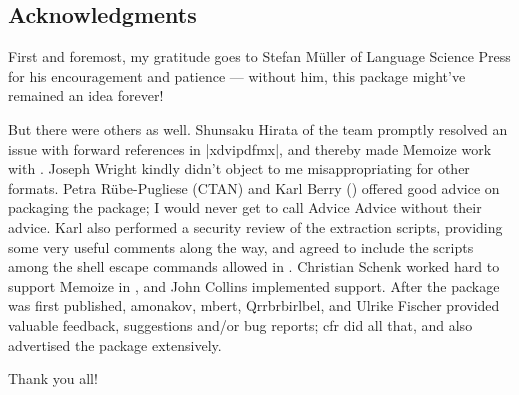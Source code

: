 \documentclass[a4paper,11pt]{article}
\begin{document}
\subsection{Acknowledgments}

First and foremost, my gratitude goes to Stefan Müller of Language Science
Press for his encouragement and patience --- without him, this package might've
remained an idea forever!

But there were others as well.  Shunsaku Hirata of the  team
promptly resolved an issue with forward references in |xdvipdfmx|, and thereby
made Memoize work with .  Joseph Wright kindly didn't object to
me misappropriating  for other formats.  Petra Rübe-Pugliese
(CTAN) and Karl Berry (\TeXLive) offered good advice on packaging the package;
I would never get to call Advice Advice without their advice.  Karl also
performed a security review of the extraction scripts, providing some very
useful comments along the way, and agreed to include the scripts among the
shell escape commands allowed in \TeXLive.  Christian Schenk worked hard to
support Memoize in \MiKTeX, and John Collins implemented  support.
After the package was first published, amonakov, mbert, Qrrbrbirlbel, and
Ulrike Fischer provided valuable feedback, suggestions and\slash or bug
reports; cfr did all that, and also advertised the package extensively.

Thank you all!


\printindex
\end{document}
